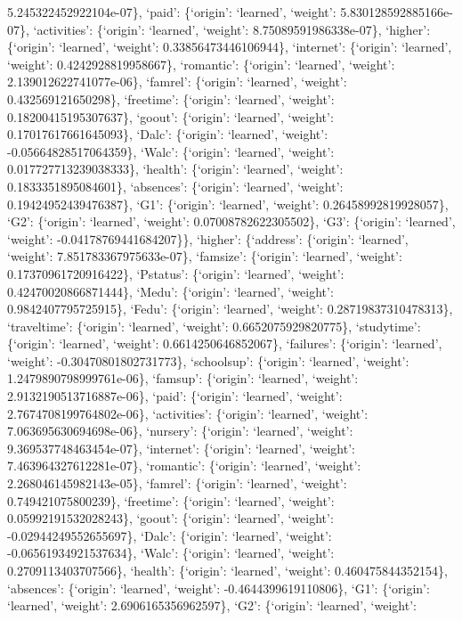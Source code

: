 \documentclass[
]{article}
\begin{document}
5.245322452922104e-07\}, `paid': \{`origin': `learned', `weight':
5.830128592885166e-07\}, `activities': \{`origin': `learned', `weight':
8.75089591986338e-07\}, `higher': \{`origin': `learned', `weight':
0.33856473446106944\}, `internet': \{`origin': `learned', `weight':
0.4242928819958667\}, `romantic': \{`origin': `learned', `weight':
2.139012622741077e-06\}, `famrel': \{`origin': `learned', `weight':
0.432569121650298\}, `freetime': \{`origin': `learned', `weight':
0.18200415195307637\}, `goout': \{`origin': `learned', `weight':
0.17017617661645093\}, `Dalc': \{`origin': `learned', `weight':
-0.05664828517064359\}, `Walc': \{`origin': `learned', `weight':
0.017727713239038333\}, `health': \{`origin': `learned', `weight':
0.1833351895084601\}, `absences': \{`origin': `learned', `weight':
0.19424952439476387\}, `G1': \{`origin': `learned', `weight':
0.26458992819928057\}, `G2': \{`origin': `learned', `weight':
0.07008782622305502\}, `G3': \{`origin': `learned', `weight':
-0.04178769441684207\}\}, `higher': \{`address': \{`origin': `learned',
`weight': 7.851783367975633e-07\}, `famsize': \{`origin': `learned',
`weight': 0.17370961720916422\}, `Pstatus': \{`origin': `learned',
`weight': 0.42470020866871444\}, `Medu': \{`origin': `learned',
`weight': 0.9842407795725915\}, `Fedu': \{`origin': `learned', `weight':
0.28719837310478313\}, `traveltime': \{`origin': `learned', `weight':
0.6652075929820775\}, `studytime': \{`origin': `learned', `weight':
0.6614250646852067\}, `failures': \{`origin': `learned', `weight':
-0.30470801802731773\}, `schoolsup': \{`origin': `learned', `weight':
1.2479890798999761e-06\}, `famsup': \{`origin': `learned', `weight':
2.9132190513716887e-06\}, `paid': \{`origin': `learned', `weight':
2.7674708199764802e-06\}, `activities': \{`origin': `learned', `weight':
7.063695630694698e-06\}, `nursery': \{`origin': `learned', `weight':
9.369537748463454e-07\}, `internet': \{`origin': `learned', `weight':
7.463964327612281e-07\}, `romantic': \{`origin': `learned', `weight':
2.268046145982143e-05\}, `famrel': \{`origin': `learned', `weight':
0.749421075800239\}, `freetime': \{`origin': `learned', `weight':
0.05992191532028243\}, `goout': \{`origin': `learned', `weight':
-0.02944249552655697\}, `Dalc': \{`origin': `learned', `weight':
-0.06561934921537634\}, `Walc': \{`origin': `learned', `weight':
0.2709113403707566\}, `health': \{`origin': `learned', `weight':
0.460475844352154\}, `absences': \{`origin': `learned', `weight':
-0.4644399619110806\}, `G1': \{`origin': `learned', `weight':
2.6906165356962597\}, `G2': \{`origin': `learned', `weight':
\end{document}
